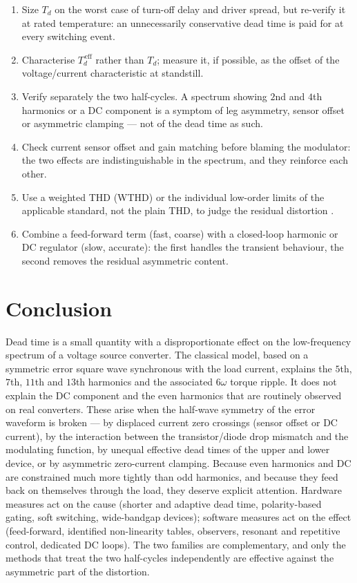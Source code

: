 \documentclass[11pt,a4paper]{article}
\begin{document}
\begin{enumerate}
\item Size $T_d$ on the worst case of turn-off delay and driver spread, but re-verify it
at rated temperature: an unnecessarily conservative dead time is paid for at every
switching event.
\item Characterise $T_{d}^{\,\mathrm{eff}}$ rather than $T_d$; measure it, if possible, as
the offset of the voltage/current characteristic at standstill.
\item Verify separately the two half-cycles. A spectrum showing $2$nd and $4$th harmonics
or a DC component is a symptom of leg asymmetry, sensor offset or asymmetric clamping ---
not of the dead time as such.
\item Check current sensor offset and gain matching before blaming the modulator: the two
effects are indistinguishable in the spectrum, and they reinforce each other.
\item Use a weighted THD (WTHD) or the individual low-order limits of the applicable
standard, not the plain THD, to judge the residual distortion \cite{holmes2003,ieee519}.
\item Combine a feed-forward term (fast, coarse) with a closed-loop harmonic or DC
regulator (slow, accurate): the first handles the transient behaviour, the second removes
the residual asymmetric content.
\end{enumerate}

\section{Conclusion}

Dead time is a small quantity with a disproportionate effect on the low-frequency spectrum
of a voltage source converter. The classical model, based on a symmetric error square wave
synchronous with the load current, explains the $5$th, $7$th, $11$th and $13$th harmonics
and the associated $6\omega$ torque ripple. It does not explain the DC component and the
even harmonics that are routinely observed on real converters. These arise when the
half-wave symmetry of the error waveform is broken --- by displaced current zero crossings
(sensor offset or DC current), by the interaction between the transistor/diode drop
mismatch and the modulating function, by unequal effective dead times of the upper and
lower device, or by asymmetric zero-current clamping. Because even harmonics and DC are
constrained much more tightly than odd harmonics, and because they feed back on themselves
through the load, they deserve explicit attention. Hardware measures act on the cause
(shorter and adaptive dead time, polarity-based gating, soft switching, wide-bandgap
devices); software measures act on the effect (feed-forward, identified non-linearity
tables, observers, resonant and repetitive control, dedicated DC loops). The two families
are complementary, and only the methods that treat the two half-cycles independently are
effective against the asymmetric part of the distortion.
\end{document}
